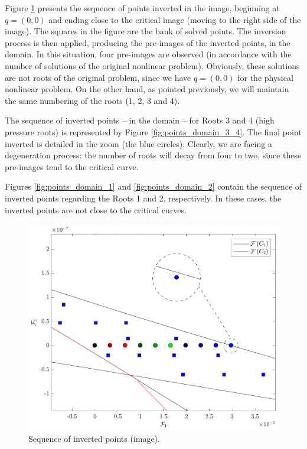 \documentclass[journal=iecred,manuscript=article]{achemso}
\theoremstyle{definition}
\theoremstyle{remark}
\begin{document}
Figure \ref{fig:points_image} presents the sequence of points inverted in the image, beginning at $q = \left(0,0\right)$ and ending close to the critical image (moving to the right side of the image). The squares in the figure are the bank of solved points. The inversion process is then applied, producing the pre-images of the inverted points, in the domain. In this situation, four pre-images are observed (in accordance with the number of solutions of the original nonlinear problem). Obviously, these solutions are not roots of the original problem, since we have $q = (0,0)$ for the physical nonlinear problem. On the other hand, as pointed previously, we will maintain the same numbering of the roots (1, 2, 3 and 4).

The sequence of inverted points -- in the domain -- for Roots 3 and 4 (high pressure roots) is represented by Figure \ref{fig:points_domain_3_4}. The final point inverted is detailed in the zoom (the blue circles). Clearly, we are facing a degeneration process: the number of roots will decay from four to two, since these pre-images tend to the critical curve.

Figures \ref{fig:points_domain_1} and \ref{fig:points_domain_2} contain the sequence of inverted points regarding the Roots 1 and 2, respectively. In these cases, the inverted points are not close to the critical curves.

\begin{figure}
	\begin{center}
		\includegraphics[scale=0.50]{sequencia_pontos_imagem.pdf}
		\caption{Sequence of inverted points (image).}\label{fig:points_image}
	\end{center}
\end{figure}
\end{document}
